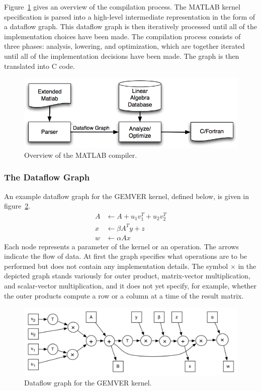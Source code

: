 \documentclass[11pt]{article}
\begin{document}
Figure~\ref{fig:compiler} gives an overview of the compilation process. The MATLAB kernel specification is parsed into a high-level intermediate representation in the form of a dataflow graph.  This dataflow graph is then iteratively processed until all of the implementation choices have been made.  The compilation process consists of three phases: analysis, lowering, and optimization, which are together iterated until all of the implementation decisions have been made.  The graph is then translated into C code.

\begin{figure}[htbp]
\centering
\includegraphics[width=.7\textwidth]{figures/compile.png}

\caption{Overview of the MATLAB compiler.}
\label{fig:compiler}
\end{figure}

\subsubsection{The Dataflow Graph}

An example dataflow graph for the GEMVER kernel, defined below, is given in figure~\ref{fig:gemver-dataflow}.
\begin{align*}
  A &\gets A + u_1 v_1^T + u_2 v_2^T \\[-0.5ex]
  x &\gets \beta A^T y + z \\[-0.5ex]
  w &\gets \alpha A x
\end{align*}
Each node represents a parameter of the kernel or an operation.  The arrows indicate the flow of data. At first the graph specifies what operations are to be performed but does not contain any implementation details. The symbol $\times$ in the depicted graph stands variously for outer product, matrix-vector multiplication, and scalar-vector multiplication, and it does not yet specify, for example, whether the outer products compute a row or a column at a time of the result matrix.

\begin{figure}[htbp]
\centering
\includegraphics[width=.7\textwidth]{figures/gemver-dataflow.png}
 
\caption{Dataflow graph for the GEMVER kernel.}
\label{fig:gemver-dataflow}
\end{figure}
\end{document}
